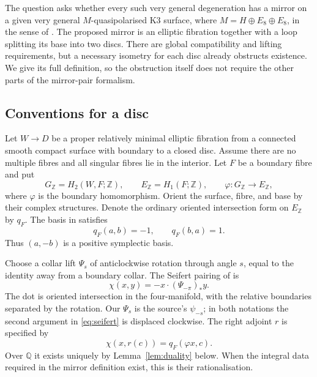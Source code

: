 \documentclass[11pt]{article}
\theoremstyle{definition}
\theoremstyle{remark}
\newcommand{\Z}{\mathbb Z}
\newcommand{\Q}{\mathbb Q}
\begin{document}
The question asks whether every such very general degeneration has a mirror on a given very general $M$-quasipolarised K3 surface, where $M=H\oplus E_8\oplus E_8$, in the sense of \cite[Definitions~4.11, 4.21, and~5.1]{GT}. The proposed mirror is an elliptic fibration together with a loop splitting its base into two discs. There are global compatibility and lifting requirements, but a necessary isometry for each disc already obstructs existence. We give its full definition, so the obstruction itself does not require the other parts of the mirror-pair formalism.

\subsection{Conventions for a disc}
Let $W\to D$ be a proper relatively minimal elliptic fibration from a connected smooth compact surface with boundary to a closed disc. Assume there are no multiple fibres and all singular fibres lie in the interior. Let $F$ be a boundary fibre and put
\[
G_{\Z}=H_2(W,F;\Z),\qquad E_{\Z}=H_1(F;\Z),\qquad
\varphi:G_{\Z}\longrightarrow E_{\Z},
\]
where $\varphi$ is the boundary homomorphism. Orient the surface, fibre, and base by their complex structures. Denote the ordinary oriented intersection form on $E_{\Z}$ by $q_F$. The basis in \cite[Definition~2.2]{GT} satisfies
\begin{equation}\label{eq:fibre}
q_F(a,b)=-1,\qquad q_F(b,a)=1.
\end{equation}
Thus $(a,-b)$ is a positive symplectic basis.

Choose a collar lift $\Psi_s$ of anticlockwise rotation through angle $s$, equal to the identity away from a boundary collar. The Seifert pairing of \cite[Definition~4.1]{GT} is
\begin{equation}\label{eq:seifert}
\chi(x,y)=-x\mathbin{\cdot}(\Psi_{-\pi})_*y.
\end{equation}
The dot is oriented intersection in the four-manifold, with the relative boundaries separated by the rotation. Our $\Psi_s$ is the source's $\psi_{-s}$; in both notations the second argument in \eqref{eq:seifert} is displaced clockwise. The right adjoint $r$ is specified by
\begin{equation}\label{eq:adjoint}
\chi(x,r(c))=q_F(\varphi x,c).
\end{equation}
Over $\Q$ it exists uniquely by Lemma~\ref{lem:duality} below. When the integral data required in the mirror definition exist, this is their rationalisation.
\end{document}
